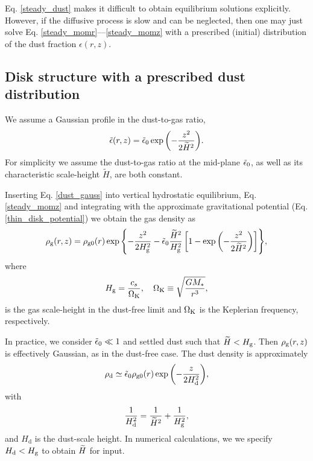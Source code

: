 Eq. \ref{steady_dust} makes it difficult to obtain equilibrium
solutions explicitly. However, if the diffusive process is slow and
can be neglected, then one may just solve
Eq. \ref{steady_momr}---\ref{steady_momz} with a prescribed (initial)
distribution of the dust fraction $\epsilon(r,z)$. 

\subsection{Disk structure with a prescribed dust distribution} 
We assume a Gaussian profile in the dust-to-gas ratio, 
\begin{align}\label{dust_gauss}
  \tilde{\epsilon}(r,z) = \tilde{\epsilon}_0
  \exp{\left(-\frac{z^2}{2\widetilde{H}^2}\right)}. 
\end{align}
For simplicity we assume the dust-to-gas ratio at the mid-plane
$\tilde{\epsilon}_0$, as well as its characteristic scale-height
$\widetilde{H}$, are both constant.


Inserting Eq. \ref{dust_gauss} into vertical hydrostatic equilibrium,
Eq. \ref{steady_momz} and integrating with the approximate
gravitational potential (Eq. \ref{thin_disk_potential}) we obtain the
gas density as
\begin{align}
  \rho_\mathrm{g}(r,z) = \rho_\mathrm{g0}(r)\exp{\left\{ - \frac{z^2}{2H_\mathrm{g}^2}
    -\tilde{\epsilon}_0\frac{\widetilde{H}^2}{H_\mathrm{g}^2}\left[1 -
      \exp{\left(-\frac{z^2}{2\widetilde{H}^2}\right)}\right] \right\}}, 
\end{align}
where
\begin{align}
  H_\mathrm{g} = \frac{c_s}{\Omega_{\rm K}}, \quad \Omega_{\rm K} \equiv \sqrt{\frac{GM_*}{r^3}},   
\end{align}
is the gas scale-height in the dust-free limit and $\Omega_{\rm K}$ is the
Keplerian frequency, respectively. 

In practice, we consider $\tilde{\epsilon}_0 \ll 1$ and settled dust such that
$\widetilde{H}<H_\mathrm{g}$. Then $\rho_\mathrm{g}(r,z)$ is effectively Gaussian, as in the
dust-free case. The dust density is approximately 
\begin{align}
  \rho_\mathrm{d} \simeq \tilde{\epsilon}_0\rho_\mathrm{g0}(r) \exp
        {\left(-\frac{z}{2H_\mathrm{d}^2}\right)}, 
\end{align}
with 
\begin{align}
  \frac{1}{H_\mathrm{d}^2} = \frac{1}{\widetilde{H}^2} + \frac{1}{H_\mathrm{g}^2}, 
\end{align}
and $H_\mathrm{d}$ is the dust-scale height. In numerical
calculations, we  we specify $H_\mathrm{d}< H_\mathrm{g}$ to obtain 
$\widetilde{H}$ for input. 

